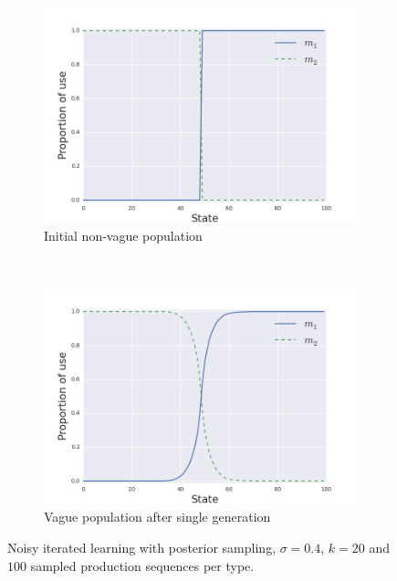 \documentclass[10pt,a4paper]{article}
\begin{document}
\begin{figure}[ht]
  \centering
  \begin{subfigure}[b]{0.45\textwidth}
    \includegraphics[scale=0.4]{../code/plots/vag-gen0.png}
    \caption{Initial non-vague population}
    \label{fig:vaga}
  \end{subfigure}
  ~
   \begin{subfigure}[b]{0.45\textwidth}
    \includegraphics[scale=0.4]{../code/plots/vag-gen1.png}
    \caption{Vague population after single generation}
    \label{fig:vagb}

  \end{subfigure}
  \caption{Noisy iterated learning with posterior sampling, $\sigma = 0.4$, $k = 20$ and $100$ sampled production sequences per type.}
  \label{fig:vag}
\end{figure}
 
\end{document}
